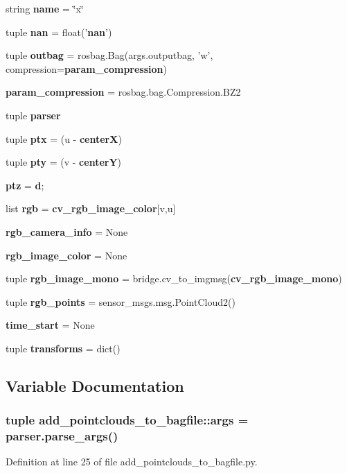 \begin{DoxyCompactItemize}
\item 
string {\bf name} = \char`\"{}x\char`\"{}
\item 
tuple {\bf nan} = float('{\bf nan}')
\item 
tuple {\bf outbag} = rosbag.\-Bag(args.\-outputbag, 'w', compression={\bf param\-\_\-compression})
\item 
{\bf param\-\_\-compression} = rosbag.\-bag.\-Compression.\-B\-Z2
\item 
tuple {\bf parser}
\item 
tuple {\bf ptx} = (u -\/ {\bf center\-X})
\item 
tuple {\bf pty} = (v -\/ {\bf center\-Y})
\item 
{\bf ptz} = {\bf d};
\item 
list {\bf rgb} = {\bf cv\-\_\-rgb\-\_\-image\-\_\-color}[v,u]
\item 
{\bf rgb\-\_\-camera\-\_\-info} = \-None
\item 
{\bf rgb\-\_\-image\-\_\-color} = \-None
\item 
tuple {\bf rgb\-\_\-image\-\_\-mono} = bridge.\-cv\-\_\-to\-\_\-imgmsg({\bf cv\-\_\-rgb\-\_\-image\-\_\-mono})
\item 
tuple {\bf rgb\-\_\-points} = sensor\-\_\-msgs.\-msg.\-Point\-Cloud2()
\item 
{\bf time\-\_\-start} = \-None
\item 
tuple {\bf transforms} = dict()
\end{DoxyCompactItemize}


\subsection{\-Variable \-Documentation}
\subsubsection[{args}]{\setlength{\rightskip}{0pt plus 5cm}tuple {\bf add\-\_\-pointclouds\-\_\-to\-\_\-bagfile\-::args} = parser.\-parse\-\_\-args()}\label{namespaceadd__pointclouds__to__bagfile_a5e40e500d738c1b2ffa14ef759854117}


\-Definition at line 25 of file add\-\_\-pointclouds\-\_\-to\-\_\-bagfile.\-py.

